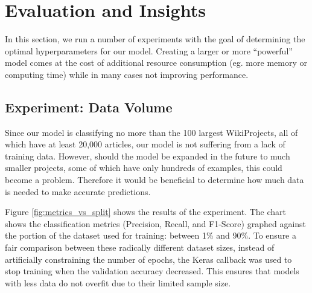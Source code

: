 \documentclass{article}
\newcommand*{\code}[1]{\texttt{\detokenize{#1}}}
\begin{document}
\newpage

\section{Evaluation and Insights}

In this section, we run a number of experiments with the goal of determining the optimal
hyperparameters for our model. Creating a larger or more ``powerful'' model comes at the cost
of additional resource consumption (eg. more memory or computing time) while in many cases
not improving performance.

\subsection{Experiment: Data Volume}

Since our model is classifying no more than the 100 largest WikiProjects, all of which have
at least 20,000 articles, our model is not suffering from a lack of training data. However,
should the model be expanded in the future to much smaller projects, some of which have only
hundreds of examples, this could become a problem. Therefore it would be beneficial to determine
how much data is needed to make accurate predictions.

Figure \ref{fig:metrics_vs_split} shows the results of the experiment. The chart shows the
classification metrics (Precision, Recall, and F1-Score) graphed against the portion of the
dataset used for training: between 1\% and 90\%. To ensure a fair comparison between these
radically different dataset sizes, instead of artificially constraining the number of epochs,
the Keras callback \code{EarlyStopping} was used to stop training when the validation accuracy
decreased. This ensures that models with less data do not overfit due to their limited sample size.
\end{document}
